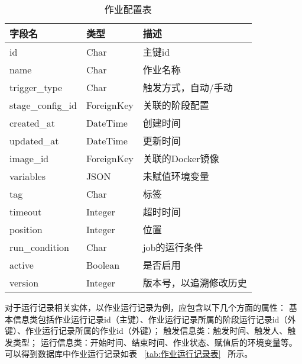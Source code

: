 \begin{table}[h]
  \centering
  \caption{作业配置表}
  \label{tab:作业配置表}
  \begin{tabular}{lll}
    \toprule
    字段名                  & 类型            & 描述                                       \\
    \midrule
    id                      & Char           & 主键id                                   \\
    name                    & Char           & 作业名称                                   \\
    trigger\_type           & Char           & 触发方式，自动/手动                        \\
    stage\_config\_id       & ForeignKey     & 关联的阶段配置                             \\
    created\_at             & DateTime       & 创建时间                                    \\
    updated\_at             & DateTime       & 更新时间                                    \\
    image\_id               & ForeignKey     & 关联的Docker镜像                            \\
    variables               & JSON           & 未赋值环境变量                              \\
    tag                     & Char           & 标签                                       \\
    timeout                 & Integer        & 超时时间                                    \\
    position                & Integer        & 位置                                        \\
    run\_condition          & Char           & job的运行条件                               \\
    active                  & Boolean        & 是否启用                                    \\
    version                 & Integer        & 版本号，以追溯修改历史                        \\
    \bottomrule
  \end{tabular}
\end{table}

对于运行记录相关实体，以作业运行记录为例，应包含以下几个方面的属性：
基本信息类包括作业运行记录id（主键）、作业运行记录所属的阶段运行记录id（外键）、作业运行记录所属的作业id（外键）；
触发信息类：触发时间、触发人、触发类型；
运行信息类：开始时间、结束时间、作业状态、赋值后的环境变量等。
可以得到数据库中作业运行记录如表 ~\ref{tab:作业运行记录表} ~所示。

